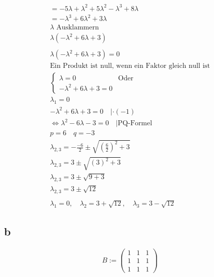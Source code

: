 \begin{align*}
    = -5\lambda +\lambda^2 +5\lambda^2 -\lambda^3 + 8\lambda                 \\
    = -\lambda^3 + 6\lambda^2 + 3\lambda                                     \\
    \text{$\lambda$ Ausklammern}                                             \\
    \lambda (-\lambda^2 + 6\lambda + 3)                                      \\\\
    \lambda (-\lambda^2 + 6\lambda + 3) = 0                                  \\
    \text{Ein Produkt ist null, wenn ein Faktor gleich null ist}             \\
    \begin{cases}
        \lambda = 0 & \text{Oder} \\
        -\lambda^2 + 6\lambda + 3 = 0
    \end{cases}                                             \\
    \lambda_1 = 0                                                            \\
    -\lambda^2 + 6 \lambda + 3 = 0 \quad |\cdot (-1)                         \\
    \Leftrightarrow \lambda^2 - 6 \lambda - 3 = 0 \quad | \text{PQ-Formel}   \\
    p = 6 \quad q = -3                                                       \\
    \lambda_{2,3} = -\frac{-6}{2} \pm \sqrt{\left(\frac{6}{2}\right)^2 + 3}  \\
    \lambda_{2,3}= 3 \pm \sqrt{\left(3\right)^2 + 3}                         \\
    \lambda_{2,3}= 3 \pm \sqrt{9 + 3}                                        \\
    \lambda_{2,3}= 3 \pm \sqrt{12}                                           \\\\
    \lambda_1 = 0, \quad \lambda_2 = 3 + \sqrt{12}, \quad \lambda_3 = 3 - \sqrt{12}
\end{align*}

\subsection{b}

\begin{align*}
    B := \begin{pmatrix}
             1 & 1 & 1 \\
             1 & 1 & 1 \\
             1 & 1 & 1
         \end{pmatrix}
\end{align*}


